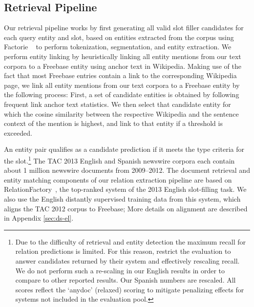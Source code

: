 
\subsection{Retrieval Pipeline \label{sec:pipeline}}
Our retrieval pipeline works by first generating all valid slot filler candidates for each query entity and slot, based on entities extracted from the corpus using {\sc Factorie} ~\citep{mccallum09:factorie:} to perform tokenization, segmentation, and entity extraction. We perform entity linking by heuristically linking all entity mentions from our text corpora to a Freebase entity using anchor text in Wikipedia. Making use of the fact that most Freebase entries contain a link to the corresponding Wikipedia page, we link all entity mentions from our text corpora to a Freebase entity by the following process:
First, a set of candidate entities is obtained by following frequent link anchor text statistics.
We then select that candidate entity for which the cosine similarity between the respective Wikipedia and the sentence context of the mention is highest, and link to that entity if a threshold is exceeded.

An entity pair qualifies as a candidate prediction if it meets the type criteria for the slot.\footnote{Due to the difficulty of retrieval and entity detection the maximum recall for relation predictions is limited. For this reason, \citet{surdeanu2012multi} restrict the evaluation to answer candidates returned by their system and effectively rescaling recall. We do not perform such a re-scaling in our English results in order to compare to other reported results. Our Spanish numbers are rescaled. All scores reflect the `anydoc' (relaxed) scoring to mitigate penalizing effects for systems not included in the evaluation pool.} The TAC 2013 English and Spanish newswire corpora each contain about 1 million newswire documents from 2009--2012. The document retrieval and entity matching components of our relation extraction pipeline are based on RelationFactory~\citep{roth2014relationfactory}, the top-ranked system of the 2013 English slot-filling task. We also use the English distantly supervised training data from this system, which aligns the TAC 2012 corpus to Freebase; More details on alignment are described in Appendix \ref{sec:ds-el}.

